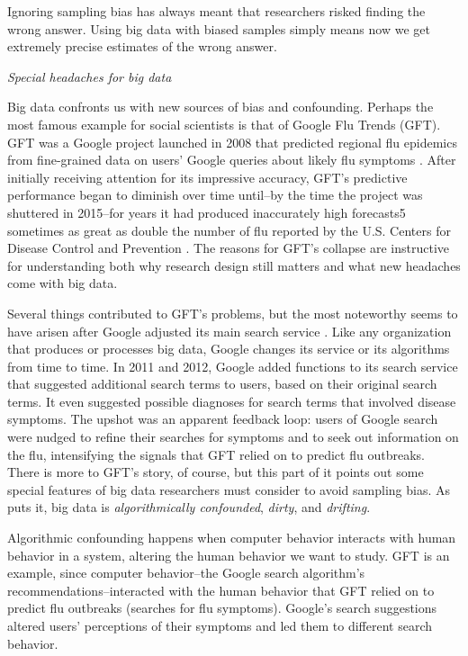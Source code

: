 \documentclass[12pt,]{article}
\begin{document}
Ignoring sampling bias has always meant that researchers risked finding
the wrong answer. Using big data with biased samples simply means now we
get extremely precise estimates of the wrong answer.

\emph{Special headaches for big data}

Big data confronts us with new sources of bias and confounding. Perhaps
the most famous example for social scientists is that of Google Flu
Trends (GFT). GFT was a Google project launched in 2008 that predicted
regional flu epidemics from fine-grained data on users' Google queries
about likely flu symptoms \citep{Getal2009}. After initially receiving
attention for its impressive accuracy, GFT's predictive performance
began to diminish over time until--by the time the project was shuttered
in 2015--for years it had produced inaccurately high forecasts5
sometimes as great as double the number of flu reported by the U.S.
Centers for Disease Control and Prevention \citep{harford14}. The
reasons for GFT's collapse are instructive for understanding both why
research design still matters and what new headaches come with big data.

Several things contributed to GFT's problems, but the most noteworthy
seems to have arisen after Google adjusted its main search service
\citep[see][]{LKKV14}. Like any organization that produces or processes
big data, Google changes its service or its algorithms from time to
time. In 2011 and 2012, Google added functions to its search service
that suggested additional search terms to users, based on their original
search terms. It even suggested possible diagnoses for search terms that
involved disease symptoms. The upshot was an apparent feedback loop:
users of Google search were nudged to refine their searches for symptoms
and to seek out information on the flu, intensifying the signals that
GFT relied on to predict flu outbreaks. There is more to GFT's story, of
course, but this part of it points out some special features of big data
researchers must consider to avoid sampling bias. As \citet{salganik17}
puts it, big data is \emph{algorithmically confounded}, \emph{dirty},
and \emph{drifting}.

Algorithmic confounding happens when computer behavior interacts with
human behavior in a system, altering the human behavior we want to
study. GFT is an example, since computer behavior--the Google search
algorithm's recommendations--interacted with the human behavior that GFT
relied on to predict flu outbreaks (searches for flu symptoms). Google's
search suggestions altered users' perceptions of their symptoms and led
them to different search behavior.
\end{document}
